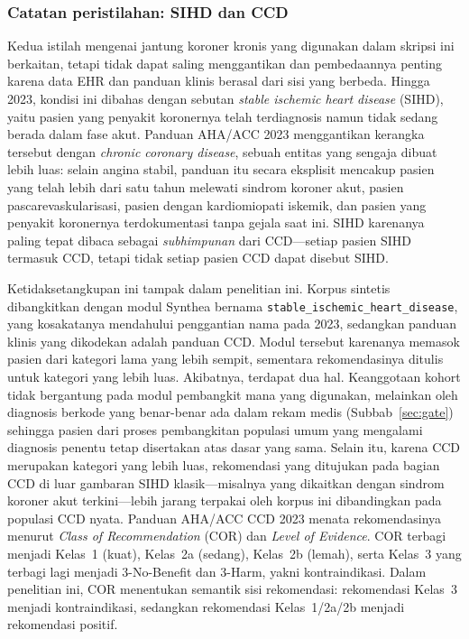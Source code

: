 \subsubsection*{Catatan peristilahan: SIHD dan CCD}
Kedua istilah mengenai jantung koroner kronis yang digunakan dalam skripsi ini berkaitan, tetapi tidak dapat saling menggantikan dan
pembedaannya penting karena data EHR dan panduan klinis berasal dari sisi yang berbeda. Hingga 2023,
kondisi ini dibahas dengan sebutan \emph{stable ischemic heart disease} (SIHD), yaitu pasien yang
penyakit koronernya telah terdiagnosis namun tidak sedang berada dalam fase akut. Panduan AHA/ACC
2023 \cite{virani2023} menggantikan kerangka tersebut dengan \emph{chronic coronary disease},
sebuah entitas yang sengaja dibuat lebih luas: selain angina stabil, panduan itu secara
eksplisit mencakup pasien yang telah lebih dari satu tahun melewati sindrom koroner akut,
pasien pascarevaskularisasi, pasien dengan kardiomiopati iskemik, dan pasien yang penyakit
koronernya terdokumentasi tanpa gejala saat ini. SIHD karenanya paling tepat dibaca sebagai
\emph{subhimpunan} dari CCD---setiap pasien SIHD termasuk CCD, tetapi tidak setiap pasien CCD dapat
disebut SIHD.

Ketidaksetangkupan ini tampak dalam penelitian ini. Korpus sintetis dibangkitkan dengan modul
Synthea bernama \texttt{stable\_ischemic\_heart\_disease}, yang kosakatanya mendahului
penggantian nama pada 2023, sedangkan panduan klinis yang dikodekan adalah panduan CCD. Modul
tersebut karenanya memasok pasien dari kategori lama yang lebih sempit, sementara
rekomendasinya ditulis untuk kategori yang lebih luas. Akibatnya, terdapat dua hal. Keanggotaan
kohort tidak bergantung pada modul pembangkit mana yang digunakan, melainkan
oleh diagnosis berkode yang benar-benar ada dalam rekam medis (Subbab~\ref{sec:gate})
sehingga pasien dari proses pembangkitan populasi umum yang mengalami diagnosis penentu tetap
disertakan atas dasar yang sama. Selain itu, karena CCD merupakan kategori yang lebih luas,
rekomendasi yang ditujukan pada bagian CCD di luar gambaran SIHD klasik---misalnya yang
dikaitkan dengan sindrom koroner akut terkini---lebih jarang terpakai oleh korpus ini
dibandingkan pada populasi CCD nyata. Panduan AHA/ACC CCD 2023 \cite{virani2023}
menata rekomendasinya menurut \emph{Class of Recommendation} (COR) dan
\emph{Level of Evidence}. COR terbagi menjadi Kelas~1 (kuat), Kelas~2a (sedang),
Kelas~2b (lemah), serta Kelas~3 yang terbagi lagi menjadi 3-No-Benefit dan 3-Harm, yakni
kontraindikasi. Dalam penelitian ini,
COR menentukan semantik sisi rekomendasi: rekomendasi Kelas~3 menjadi kontraindikasi,
sedangkan rekomendasi Kelas~1/2a/2b menjadi rekomendasi positif.

